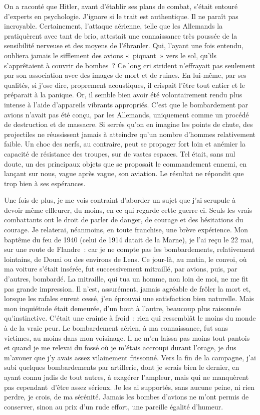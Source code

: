 \documentclass[french,twoside]{book} %
\begin{document}
\noindent On a raconté que Hitler, avant d’établir ses plans de combat, s’était entouré d’experts en psychologie. J’ignore si le trait est authentique. Il ne paraît pas incroyable. Certainement, l’attaque aérienne, telle que les Allemands la pratiquèrent avec tant de brio, attestait une connaissance très poussée de la sensibilité nerveuse et des moyens de l’ébranler. Qui, l’ayant une fois entendu, oubliera jamais le sifflement des avions « piquant » vers le sol, qu’ils s’apprêtaient à couvrir de bombes ? Ce long cri strident n’effrayait pas seulement par son association avec des images de mort et de ruines. En lui-même, par ses qualités, si j’ose dire, proprement acoustiques, il crispait l’être tout entier et le préparait à la panique. Or, il semble bien avoir été volontairement rendu plus intense à l’aide d’appareils vibrants appropriés. C’est que le bombardement par avions n’avait pas été conçu, par les Allemands, uniquement comme un procédé de destruction et de massacre. Si serrés qu’on en imagine les points de chute, des projectiles   ne réussissent jamais à atteindre qu’un nombre d’hommes relativement faible. Un choc des nerfs, au contraire, peut se propager fort loin et anémier la capacité de résistance des troupes, sur de vastes espaces. Tel était, sans nul doute, un des principaux objets que se proposait le commandement ennemi, en lançant sur nous, vague après vague, son aviation. Le résultat ne répondit que trop bien à ses espérances.\par
Une fois de plus, je me vois contraint d’aborder un sujet que j’ai scrupule à devoir même effleurer, du moins, en ce qui regarde cette guerre-ci. Seuls les vrais combattants ont le droit de parler de danger, de courage et des hésitations du courage. Je relaterai, néanmoins, en toute franchise, une brève expérience. Mon baptême du feu de 1940 (celui de 1914 datait de la Marne), je l’ai reçu le 22 mai, sur une route de Flandre : car je ne compte pas les bombardements, relativement lointains, de Douai ou des environs de Lens. Ce jour-là, au matin, le convoi, où ma voiture s’était insérée, fut successivement mitraillé, par avions, puis, par d’autres, bombardé. La mitraille, qui tua un homme, non loin de moi, ne me fit pas grande impression. Il n’est, assurément, jamais agréable de frôler la mort et, lorsque les rafales eurent cessé, j’en éprouvai une satisfaction bien naturelle. Mais mon inquiétude était demeurée, d’un bout à l’autre, beaucoup plus raisonnée qu’instinctive. C’était une crainte à froid : rien qui ressemblât le moins du monde à de la vraie peur. Le bombardement aérien, à ma connaissance, fut sans victimes, au moins dans mon voisinage. Il ne m’en laissa pas moins tout pantois et quand je me relevai du fossé où je m’étais accroupi durant l’orage, je dus m’avouer que j’y avais assez vilainement frissonné. Vers la fin de la campagne, j’ai subi quelques bombardements par artillerie, dont je serais bien le dernier, en ayant connu jadis de tout autres, à exagérer l’ampleur, mais qui ne manquèrent pas   cependant d’être assez sérieux. Je les ai supportés, sans aucune peine, ni rien perdre, je crois, de ma sérénité. Jamais les bombes d’avions ne m’ont permis de conserver, sinon au prix d’un rude effort, une pareille égalité d’humeur.\par
\end{document}
